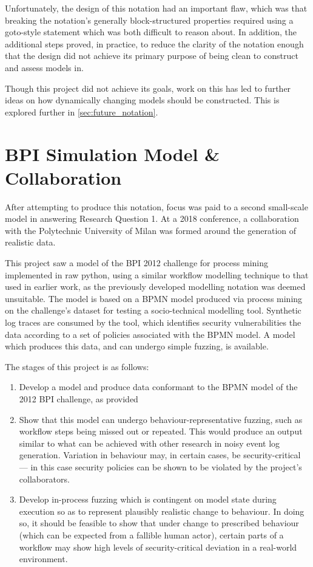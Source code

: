 \documentclass[11pt]{article}
\newcommand{\ampersand}{\&}
\begin{document}

Unfortunately, the design of this notation had an important flaw, which was that
breaking the notation's generally block-structured properties required using a
goto-style statement which was both difficult to reason about. In addition, the
additional steps proved, in practice, to reduce the clarity of the notation
enough that the design did not achieve its primary purpose of being clean to
construct and assess models in.

Though this project did not achieve its goals, work on this has led to further
ideas on how dynamically changing models should be constructed. This is explored
further in \cref{sec:future_notation}.

\section{BPI Simulation Model \ampersand{} Collaboration}
\label{sec:org9c70ad4}
\label{sec:mattia_model}
After attempting to produce this notation, focus was paid to a second
small-scale model in answering Research Question 1. At a 2018 conference, a
collaboration with the Polytechnic University of Milan was formed around the
generation of realistic data.

This project saw a model of the BPI 2012 challenge for process mining
implemented in raw python, using a similar workflow modelling technique to that
used in earlier work\cite{pdsf_paper}, as the previously developed modelling
notation was deemed unsuitable. The model is based on a BPMN model
produced via process mining on the challenge's dataset\cite{van3536bpi} for
testing a socio-technical modelling tool. Synthetic log traces are consumed by
the tool, which identifies security vulnerabilities the data according to a set
of policies associated with the BPMN model. A model which produces this data,
and can undergo simple fuzzing, is available\cite{bpi_model_repo}. 

The stages of this project is as follows:

\begin{enumerate}
\item Develop a model and produce data conformant to the BPMN model of the 2012 BPI
challenge, as provided
\item Show that this model can undergo behaviour-representative fuzzing, such as
workflow steps being missed out or repeated. This would produce an output
similar to what can be achieved with other research in noisy event log
generation\cite{secsy,on_bp_variant_generation}. Variation in behaviour may,
in certain cases, be security-critical --- in this case security policies can
be shown to be violated by the project's collaborators.
\item Develop in-process fuzzing which is contingent on model state during
execution so as to represent plausibly realistic change to behaviour. In
doing so, it should be feasible to show that under change to prescribed
behaviour (which can be expected from a fallible human actor), certain parts
of a workflow may show high levels of security-critical deviation in a
real-world environment.
\end{enumerate}
\end{document}
